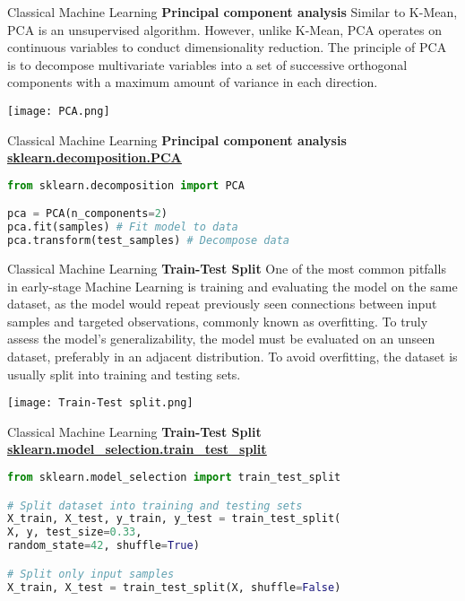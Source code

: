 \documentclass{beamer}
\begin{document}
\begin{frame}[fragile]{Classical Machine Learning}
    \textbf{Principal component analysis}
    Similar to K-Mean, PCA is an unsupervised algorithm. However, unlike K-Mean, PCA operates on continuous variables to conduct dimensionality reduction. The principle of PCA is to decompose multivariate variables into a set of successive orthogonal components with a maximum amount of variance in each direction.
    \begin{center}
        \texttt{[image: PCA.png]}
    \end{center}
\end{frame}
\begin{frame}[fragile]{Classical Machine Learning}
    \textbf{Principal component analysis}
    \href{https://scikit-learn.org/stable/modules/generated/sklearn.decomposition.PCA.html}{\textbf{\underline{sklearn.decomposition.PCA}}}
    \begin{example}
        \begin{lstlisting}[language=Python]
from sklearn.decomposition import PCA

pca = PCA(n_components=2)
pca.fit(samples) # Fit model to data
pca.transform(test_samples) # Decompose data
        \end{lstlisting}
    \end{example}
\end{frame}
\begin{frame}[fragile]{Classical Machine Learning}
    \textbf{Train-Test Split}
    One of the most common pitfalls in early-stage Machine Learning is training and evaluating the model on the same dataset, as the model would repeat previously seen connections between input samples and targeted observations, commonly known as overfitting. To truly assess the model's generalizability, the model must be evaluated on an unseen dataset, preferably in an adjacent distribution. To avoid overfitting, the dataset is usually split into training and testing sets.
    \begin{center}
        \texttt{[image: Train-Test split.png]}
    \end{center}
\end{frame}
\begin{frame}[fragile]{Classical Machine Learning}
    \textbf{Train-Test Split}
    \href{https://scikit-learn.org/stable/modules/generated/sklearn.model_selection.train_test_split.html}{\textbf{\underline{sklearn.model\_selection.train\_test\_split}}}
    \begin{example}
        \begin{lstlisting}[language=Python]
from sklearn.model_selection import train_test_split

# Split dataset into training and testing sets
X_train, X_test, y_train, y_test = train_test_split(
X, y, test_size=0.33,
random_state=42, shuffle=True)

# Split only input samples
X_train, X_test = train_test_split(X, shuffle=False)
        \end{lstlisting}
    \end{example}
\end{frame}
\end{document}
